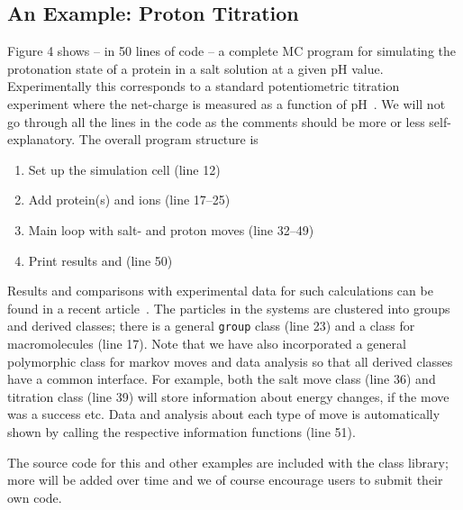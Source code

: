 \documentclass[10pt]{bmc_article}
\newenvironment{bmcformat}{\begin{raggedright}\baselineskip20pt\sloppy\setboolean{publ}{false}}{\end{raggedright}\baselineskip20pt\sloppy}
\begin{document}
\begin{bmcformat}


\subsection*{An Example: Proton Titration}
Figure 4 shows -- in 50 lines of code -- a complete MC program for simulating the protonation state of a protein in a salt solution at a given pH value.
Experimentally this corresponds to a standard potentiometric titration experiment where the net-charge is measured as a function of pH~\cite{tanford:72}.
We will not go through all the lines in the code as the comments should be more or less self-explanatory.
The overall program structure is
\begin{enumerate}
\item Set up the simulation cell (line 12)
\item Add protein(s) and ions (line 17--25)
\item Main loop with salt- and proton moves (line 32--49)
\item Print results and (line 50)
\end{enumerate}
Results and comparisons with experimental data for such calculations can be found in a recent article~\cite{lund:07}.
The particles in the systems are clustered into groups and derived classes; there is a general \verb"group" class (line 23) and a class for macromolecules (line 17).
Note that we have also incorporated a general polymorphic class for markov moves and data analysis so that all derived classes have a common interface.
For example, both the salt move class (line 36) and titration class (line 39) will store information about energy changes, if the move was a success etc.
Data and analysis about each type of move is automatically shown by calling the respective information functions (line 51).

The source code for this and other examples are included with the class library; more will be added over time and we of course encourage users to submit their own code.


\end{bmcformat}
\end{document}
